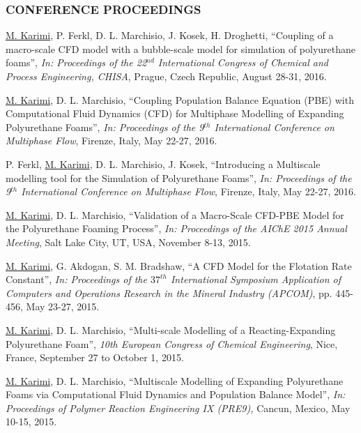 \documentclass[10pt,a4]{article}
\newcounter{myEnumCounter}
\newcounter{mySaveCounter}
\renewenvironment{enumerate}{%
  \begin{list}{\arabic{myEnumCounter}.}{\usecounter{myEnumCounter}%
  \setcounter{myEnumCounter}{\value{mySaveCounter}}}
  }{%
  \setcounter{mySaveCounter}{\value{myEnumCounter}}\end{list}%
}
\newcommand{\quotes}[1]{``#1''}
\begin{document}
\begin{small}
\subsubsection*{CONFERENCE PROCEEDINGS}

\begin{enumerate}

	\item 
\underline{M. Karimi}, P. Ferkl, D. L. Marchisio, J. Kosek, H. Droghetti, \quotes{Coupling of a macro-scale CFD model with a bubble-scale model for simulation of polyurethane foams}, \textit{In: Proceedings of the 22$^{nd}$ International Congress of Chemical and Process Engineering, CHISA}, Prague, Czech Republic, August 28-31, 2016.	

	\item 
\underline{M. Karimi}, D. L. Marchisio, \quotes{Coupling Population Balance Equation (PBE) with Computational Fluid Dynamics (CFD) for Multiphase Modelling of Expanding Polyurethane Foams}, \textit{In: Proceedings of the 9$^{th}$ International Conference on Multiphase Flow}, Firenze, Italy, May 22-27, 2016.

	\item
P. Ferkl, \underline{M. Karimi}, D. L. Marchisio, J. Kosek, \quotes{Introducing a Multiscale modelling tool for the Simulation of Polyurethane Foams}, \textit{In: Proceedings of the 9$^{th}$ International Conference on Multiphase Flow}, Firenze, Italy, May 22-27, 2016.

	\item
\underline{M. Karimi}, D. L. Marchisio, \quotes{Validation of a Macro-Scale CFD-PBE Model for the Polyurethane Foaming Process}, \textit{In: Proceedings of the AIChE 2015 Annual Meeting}, Salt Lake City, UT, USA, November 8-13, 2015.
	
	\item 
\underline{M. Karimi}, G. Akdogan, S. M. Bradshaw, \quotes{A CFD Model for the Flotation Rate Constant}, \textit{In: Proceedings of the $37^{th}$ International Symposium Application of Computers and Operations Research in the Mineral Industry (APCOM)}, pp. 445-456, May 23-27, 2015.	
	
	\item 
\underline{M. Karimi}, D. L. Marchisio, \quotes{Multi-scale Modelling of a Reacting-Expanding Polyurethane Foam}, \textit{10th European Congress of Chemical Engineering}, Nice, France, September 27 to October 1, 2015.	

	\item
\underline{M. Karimi}, D. L. Marchisio, \quotes{Multiscale Modelling of Expanding Polyurethane Foams via Computational Fluid Dynamics and Population Balance Model}, \textit{In: Proceedings of Polymer Reaction Engineering IX (PRE9),} Cancun, Mexico, May 10-15, 2015.


\end{enumerate}
\end{small}
\end{document}
